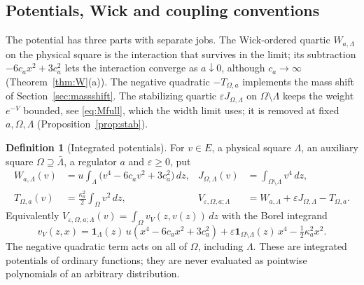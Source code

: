 \documentclass[11pt]{article}
\theoremstyle{plain}
\theoremstyle{definition}
\newtheorem{definition}[theorem]{Definition}
\theoremstyle{remark}
\newcommand{\ind}{\mathbf{1}}
\begin{document}
\subsection{Potentials, Wick and coupling conventions}\label{sec:potentials}

The potential has three parts with separate jobs. The Wick-ordered quartic $W_{a,\Lambda}$ on the physical square is the interaction that survives in the limit; its subtraction $-6c_ax^{2}+3c_a^{2}$ lets the interaction converge as $a\downarrow0$, although $c_a\to\infty$ (Theorem~\ref{thm:W}(a)). The negative quadratic $-T_{\Omega,a}$ implements the mass shift of Section~\ref{sec:massshift}. The stabilizing quartic $\varepsilon J_{\Omega,\Lambda}$ on $\Omega\setminus\Lambda$ keeps the weight $e^{-V}$ bounded, see \eqref{eq:Mfull}, which the width limit uses; it is removed at fixed $a,\Omega,\Lambda$ (Proposition~\ref{prop:stab}).

\begin{definition}[Integrated potentials]\label{def:potentials}
For $v\in E$, a physical square $\Lambda$, an auxiliary square $\Omega\supseteq\bar\Lambda$,
a regulator $a$ and $\varepsilon\ge0$, put
\begin{align}
W_{a,\Lambda}(v)&=u\int_{\Lambda}\bigl(v^{4}-6c_a v^{2}+3c_a^{2}\bigr)\,dz,&
J_{\Omega,\Lambda}(v)&=\int_{\Omega\setminus\Lambda}v^{4}\,dz,\nonumber\\
T_{\Omega,a}(v)&=\frac{\kappa_a^{2}}{2}\int_{\Omega}v^{2}\,dz,&
V_{\varepsilon,\Omega,a;\Lambda}&=W_{a,\Lambda}+\varepsilon J_{\Omega,\Lambda}-T_{\Omega,a}.
\label{eq:potential}
\end{align}
Equivalently $V_{\varepsilon,\Omega,a;\Lambda}(v)=\int_\Omega v_V(z,v(z))\,dz$ with
the Borel integrand
\begin{equation}\label{eq:vV}
v_V(z,x)=\ind_\Lambda(z)\,u(x^{4}-6c_ax^{2}+3c_a^{2})+\varepsilon\ind_{\Omega\setminus\Lambda}(z)\,x^{4}-\tfrac12\kappa_a^{2}x^{2}.
\end{equation}
The negative quadratic term acts on all of $\Omega$, including $\Lambda$. These
are integrated potentials of ordinary functions; they are never evaluated as
pointwise polynomials of an arbitrary distribution.
\end{definition}
\end{document}
